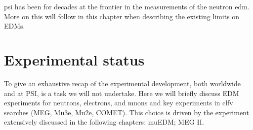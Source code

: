 \begin{refsection}
        \noindent
        \gls{psi} has been for decades at the frontier in the measurements of the neutron \gls{edm}.
        More on this will follow in this chapter when describing the existing limits on EDMs.

\section{Experimental status}
    To give an exhaustive recap of the experimental development, both worldwide and at PSI, is a task we will not undertake. 
    Here we will briefly discuss EDM experiments for neutrons, electrons, and muons and key experiments in \gls{clfv} searches (MEG, Mu3e, Mu2e, COMET).
    This choice is driven by the experiment extensively discussed in the following chapters: muEDM; MEG II.


\end{refsection}
